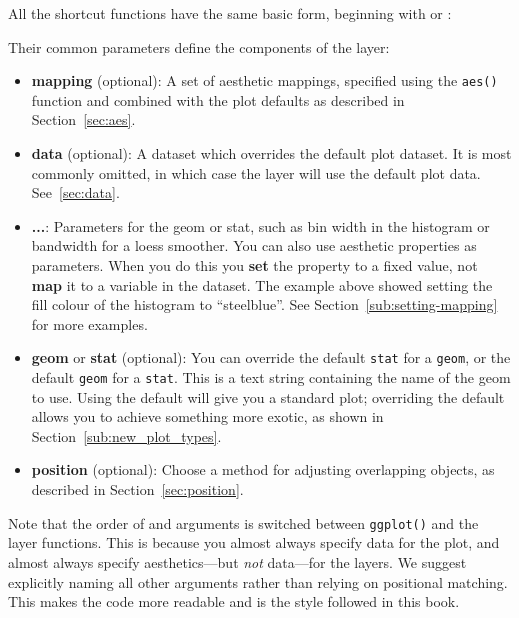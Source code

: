 \noindent All the shortcut functions have the same basic form, beginning with  or :

% 

\noindent Their common parameters define the components of the layer:

\begin{itemize}
  \item {\bf mapping} (optional): A set of aesthetic mappings, specified using the {\tt aes()} function and combined with the plot defaults as described in Section~\ref{sec:aes}.

  \item {\bf data} (optional): A dataset which overrides the default plot dataset.  It is most commonly omitted, in which case the layer will use the default plot data. See~\ref{sec:data}.
  
  \item {\bf ...}: Parameters for the geom or stat, such as bin width in the histogram or bandwidth for a loess smoother.  You can also use aesthetic properties as parameters.  When you do this you \textbf{set} the property to a fixed value,  not \textbf{map} it to a variable in the dataset.  The example above showed setting the fill colour of the histogram to ``steelblue''. See Section~\ref{sub:setting-mapping} for more examples.
  
  \item {\bf geom} or {\bf stat} (optional):  You can override the default {\tt stat} for a {\tt geom}, or the default {\tt geom} for a {\tt stat}.  This is a text string containing the name of the geom to use.  Using the default will give you a standard plot; overriding the default allows you to achieve something more exotic, as shown in Section~\ref{sub:new_plot_types}.

  \item {\bf position} (optional): Choose a method for adjusting overlapping objects, as described in Section~\ref{sec:position}.
  
\end{itemize}

Note that the order of  and  arguments is switched between {\tt ggplot()} and the layer functions.  This is because you almost always specify data for the plot, and almost always specify aesthetics---but {\em not} data---for the layers.  We suggest explicitly naming all other arguments rather than relying on positional matching.  This makes the code more readable and is the style followed in this book.

